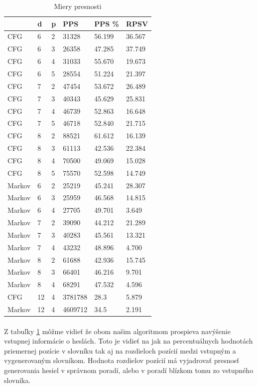 \begin{table}[]
\centering
\caption{Miery presnosti}
\label{mieryPresnosti}
\begin{tabular}{lll|lll}
       & d  & p & PPS & PPS \% & RPSV \\ \hline
CFG    & 6  & 2 & 31328    & 56.199       & 36.567     \\
CFG    & 6  & 3 & 26358    & 47.285       & 37.749     \\
CFG    & 6  & 4 & 31033    & 55.670       & 19.673     \\
CFG    & 6  & 5 & 28554    & 51.224       & 21.397     \\
CFG    & 7  & 2 & 47454    & 53.672       & 26.489     \\
CFG    & 7  & 3 & 40343    & 45.629       & 25.831     \\
CFG    & 7  & 4 & 46739    & 52.863       & 16.648     \\
CFG    & 7  & 5 & 46718    & 52.840       & 21.715     \\
CFG    & 8  & 2 & 88521    & 61.612       & 16.139     \\
CFG    & 8  & 3 & 61113    & 42.536       & 22.384     \\
CFG    & 8  & 4 & 70500    & 49.069       & 15.028     \\
CFG    & 8  & 5 & 75570    & 52.598       & 14.749     \\
Markov & 6  & 2 & 25219    & 45.241       & 28.307     \\
Markov & 6  & 3 & 25959    & 46.568       & 14.815     \\
Markov & 6  & 4 & 27705    & 49.701       & 3.649     \\
Markov & 7  & 2 & 39090    & 44.212       & 21.289     \\
Markov & 7  & 3 & 40283    & 45.561       & 13.321     \\
Markov & 7  & 4 & 43232    & 48.896       & 4.700     \\
Markov & 8  & 2 & 61688    & 42.936       & 15.745     \\
Markov & 8  & 3 & 66401    & 46.216       & 9.701     \\
Markov & 8  & 4 & 68291    & 47.532       & 4.596     \\ \hline \hline
CFG    & 12 & 4 & 3781788    & 28.3       & 5.879     \\
Markov & 12 & 4 & 4609712    & 34.5       & 2.191    
\end{tabular}
\end{table}

\paragraph{}
Z tabuľky \ref{mieryPresnosti} môžme vidieť že obom našim algoritmom prospieva navýšenie vstupnej informácie o heslách. Toto je vidieť na jak na percentuálnych hodnotách priemernej pozície v slovníku tak aj na rozdieloch pozícií medzi vstupným a vygenerovaným slovníkom. Hodnota rozdielov pozícií má vyjadrovať presnosť generovania hesiel v správnom poradí, alebo v poradí blízkom tomu zo vstupného slovníka.